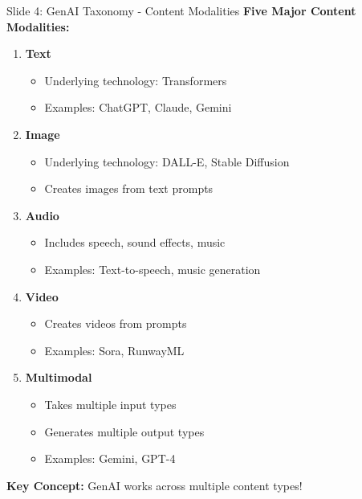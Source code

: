 \documentclass[8pt]{beamer}
\begin{document}
	\begin{frame}{Slide 4: GenAI Taxonomy - Content Modalities}
		\fontsize{6.5}{7.5}\selectfont
		\textbf{Five Major Content Modalities:}
		\begin{enumerate}
			\item \textbf{Text}
			\begin{itemize}
				\item Underlying technology: Transformers
				\item Examples: ChatGPT, Claude, Gemini
			\end{itemize}
			\item \textbf{Image}
			\begin{itemize}
				\item Underlying technology: DALL-E, Stable Diffusion
				\item Creates images from text prompts
			\end{itemize}
			\item \textbf{Audio}
			\begin{itemize}
				\item Includes speech, sound effects, music
				\item Examples: Text-to-speech, music generation
			\end{itemize}
			\item \textbf{Video}
			\begin{itemize}
				\item Creates videos from prompts
				\item Examples: Sora, RunwayML
			\end{itemize}
			\item \textbf{Multimodal}
			\begin{itemize}
				\item Takes multiple input types
				\item Generates multiple output types
				\item Examples: Gemini, GPT-4
			\end{itemize}
		\end{enumerate}
		
		\textcolor{myblue}{\textbf{Key Concept:}} GenAI works across multiple content types!
	\end{frame}
	
\end{document}
